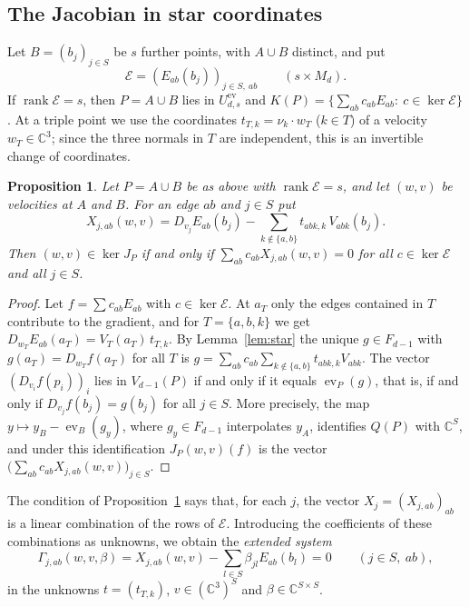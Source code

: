 \documentclass{amsart}
\newtheorem{proposition}[theorem]{Proposition}
\theoremstyle{definition}
\theoremstyle{remark}
\numberwithin{equation}{section}
\newcommand{\CC}{\mathbb{C}}
\DeclareMathOperator{\ev}{ev}
\DeclareMathOperator{\rank}{rank}
\begin{document}
\subsection{The Jacobian in star coordinates}
Let $B=(b_j)_{j\in S}$ be $s$ further points, with $A\cup B$ distinct, and put
\[
  \mathcal E=(E_{ab}(b_j))_{j\in S,\ ab}\qquad(s\times M_d).
\]
If $\rank\mathcal E=s$, then $P=A\cup B$ lies in $U^{\mathrm{ev}}_{d,s}$ and
$K(P)=\{\sum_{ab}c_{ab}E_{ab}:\ c\in\ker\mathcal E\}$. At a triple point we use the
coordinates $t_{T,k}=\nu_k\cdot w_T$ ($k\in T$) of a velocity $w_T\in\CC^3$; since the
three normals in $T$ are independent, this is an invertible change of coordinates.

\begin{proposition}\label{prop:starjac}
Let $P=A\cup B$ be as above with $\rank\mathcal E=s$, and let $(w,v)$ be velocities at
$A$ and $B$. For an edge $ab$ and $j\in S$ put
\begin{equation}\label{eq:Xrow}
  X_{j,ab}(w,v)=D_{v_j}E_{ab}(b_j)-\sum_{k\notin\{a,b\}}t_{abk,k}\,V_{abk}(b_j).
\end{equation}
Then $(w,v)\in\ker J_P$ if and only if $\sum_{ab}c_{ab}X_{j,ab}(w,v)=0$ for all
$c\in\ker\mathcal E$ and all $j\in S$.
\end{proposition}

\begin{proof}
Let $f=\sum c_{ab}E_{ab}$ with $c\in\ker\mathcal E$. At $a_T$ only the edges contained in
$T$ contribute to the gradient, and for $T=\{a,b,k\}$ we get
$D_{w_T}E_{ab}(a_T)=V_T(a_T)\,t_{T,k}$. By Lemma~\ref{lem:star} the unique
$g\in F_{d-1}$ with $g(a_T)=D_{w_T}f(a_T)$ for all $T$ is
$g=\sum_{ab}c_{ab}\sum_{k\notin\{a,b\}}t_{abk,k}V_{abk}$. The vector
$(D_{v_i}f(p_i))_i$ lies in $V_{d-1}(P)$ if and only if it equals $\ev_P(g)$, that is,
if and only if $D_{v_j}f(b_j)=g(b_j)$ for all $j\in S$. More precisely, the map
$y\mapsto y_B-\ev_B(g_y)$, where $g_y\in F_{d-1}$ interpolates $y_A$, identifies
$Q(P)$ with $\CC^S$, and under this identification $J_P(w,v)(f)$ is the vector
$\bigl(\sum_{ab}c_{ab}X_{j,ab}(w,v)\bigr)_{j\in S}$.
\end{proof}

The condition of Proposition~\ref{prop:starjac} says that, for each $j$, the vector
$X_j=(X_{j,ab})_{ab}$ is a linear combination of the rows of $\mathcal E$. Introducing
the coefficients of these combinations as unknowns, we obtain the \emph{extended
system}
\begin{equation}\label{eq:extended}
  \Gamma_{j,ab}(w,v,\beta)=X_{j,ab}(w,v)-\sum_{l\in S}\beta_{jl}E_{ab}(b_l)=0
  \qquad(j\in S,\ ab),
\end{equation}
in the unknowns $t=(t_{T,k})$, $v\in(\CC^3)^S$ and $\beta\in\CC^{S\times S}$.
\end{document}
